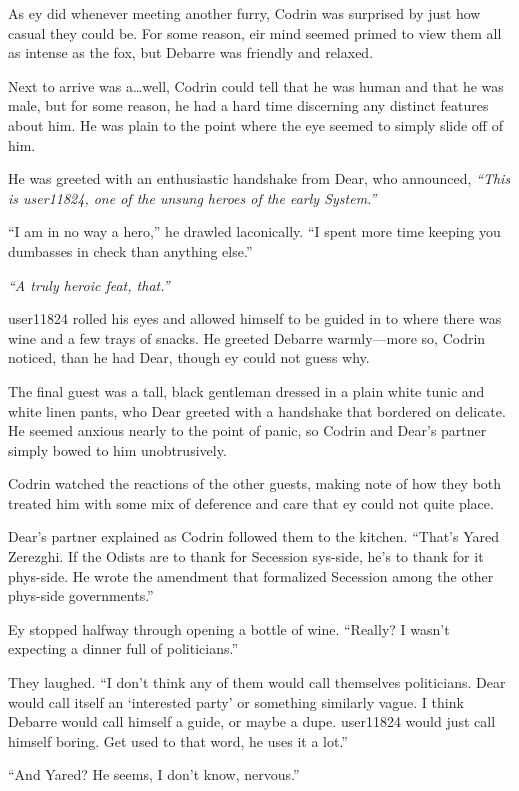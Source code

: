 As ey did whenever meeting another furry, Codrin was surprised by just how casual they could be. For some reason, eir mind seemed primed to view them all as intense as the fox, but Debarre was friendly and relaxed.

Next to arrive was a\ldots well, Codrin could tell that he was human and that he was male, but for some reason, he had a hard time discerning any distinct features about him. He was plain to the point where the eye seemed to simply slide off of him.

He was greeted with an enthusiastic handshake from Dear, who announced, \emph{``This is user11824, one of the unsung heroes of the early System.''}

``I am in no way a hero,'' he drawled laconically. ``I spent more time keeping you dumbasses in check than anything else.''

\emph{``A truly heroic feat, that.''}

user11824 rolled his eyes and allowed himself to be guided in to where there was wine and a few trays of snacks. He greeted Debarre warmly---more so, Codrin noticed, than he had Dear, though ey could not guess why.

The final guest was a tall, black gentleman dressed in a plain white tunic and white linen pants, who Dear greeted with a handshake that bordered on delicate. He seemed anxious nearly to the point of panic, so Codrin and Dear's partner simply bowed to him unobtrusively.

Codrin watched the reactions of the other guests, making note of how they both treated him with some mix of deference and care that ey could not quite place.

Dear's partner explained as Codrin followed them to the kitchen. ``That's Yared Zerezghi. If the Odists are to thank for Secession sys-side, he's to thank for it phys-side. He wrote the amendment that formalized Secession among the other phys-side governments.''

Ey stopped halfway through opening a bottle of wine. ``Really? I wasn't expecting a dinner full of politicians.''

They laughed. ``I don't think any of them would call themselves politicians. Dear would call itself an `interested party' or something similarly vague. I think Debarre would call himself a guide, or maybe a dupe. user11824 would just call himself boring. Get used to that word, he uses it a lot.''

``And Yared? He seems, I don't know, nervous.''


